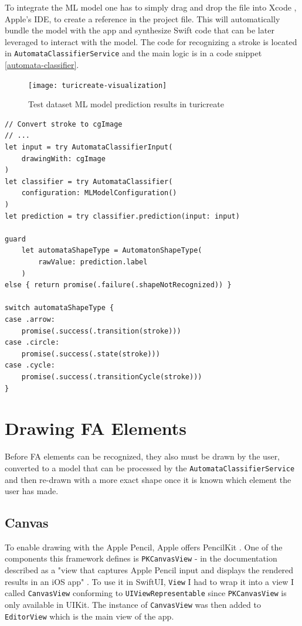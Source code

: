 To integrate the ML model one has to simply drag and drop the file into Xcode \cite{xcode}, Apple's IDE, to create a reference in the project file. This will automatically bundle the model with the app and synthesize Swift code that can be later leveraged to interact with the model. The code for recognizing a stroke is located in \lstinline{AutomataClassifierService} and the main logic is in a code snippet \ref{automata-classifier}.

\begin{figure}
    \texttt{[image: turicreate-visualization]}
    \caption{Test dataset ML model prediction results in turicreate}\label{turicreate-visualization}
\end{figure}

\begin{lstlisting}[caption=Automata classifier, label=automata-classifier]
// Convert stroke to cgImage
// ...
let input = try AutomataClassifierInput(
    drawingWith: cgImage
)
let classifier = try AutomataClassifier(
    configuration: MLModelConfiguration()
)
let prediction = try classifier.prediction(input: input)

guard
    let automataShapeType = AutomatonShapeType(
        rawValue: prediction.label
    )
else { return promise(.failure(.shapeNotRecognized)) }

switch automataShapeType {
case .arrow:
    promise(.success(.transition(stroke)))
case .circle:
    promise(.success(.state(stroke)))
case .cycle:
    promise(.success(.transitionCycle(stroke)))
}
\end{lstlisting}

\section{Drawing FA Elements}

Before FA elements can be recognized, they also must be drawn by the user, converted to a model that can be processed by the \lstinline{AutomataClassifierService} and then re-drawn with a more exact shape once it is known which element the user has made.

\subsection{Canvas}

To enable drawing with the Apple Pencil, Apple offers PencilKit \cite{pencilkit}. One of the components this framework defines is \lstinline{PKCanvasView} - in the documentation described as a "view that captures Apple Pencil input and displays the rendered results in an iOS app" \cite{pkcanvasview}. To use it in SwiftUI, \lstinline{View} I had to wrap it into a view I called \lstinline{CanvasView} conforming to \lstinline{UIViewRepresentable} since \lstinline{PKCanvasView} is only available in UIKit. The instance of \lstinline{CanvasView} was then added to \lstinline{EditorView} which is the main view of the app.

